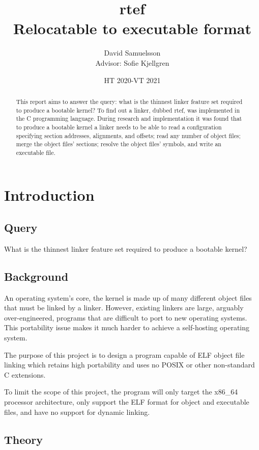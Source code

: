 \documentclass[notitlepage]{report}
\title{%
	rtef \\
	{\large Relocatable to executable format}}
\author{David Samuelsson \\
	{\small Advisor: Sofie Kjellgren}}
\affil{NTI Johanneberg}
\date{HT 2020-VT 2021}
\begin{document}
\maketitle

\begin{abstract}
This report aims to answer the query: what is the thinnest linker feature set required to produce a bootable kernel? To find out a linker, dubbed rtef, was implemented in the C programming language. During research and implementation it was found that to produce a bootable kernel a linker needs to be able to read a configuration specifying section addresses, alignments, and offsets; read any number of object files; merge the object files' sections; resolve the object files' symbols, and write an executable file.
\end{abstract}

\tableofcontents

\section{Introduction}

\subsection{Query}

What is the thinnest linker feature set required to produce a bootable kernel?

\subsection{Background}

An operating system's core, the kernel is made up of many different object files that must be linked by a linker. However, existing linkers are large, arguably over-engineered, programs that are difficult to port to new operating systems. This portability issue makes it much harder to achieve a self-hosting operating system.

The purpose of this project is to design a program capable of ELF object file linking which retains high portability and uses no POSIX or other non-standard C extensions.

To limit the scope of this project, the program will only target the x86\_64 processor architecture, only support the ELF format for object and executable files, and have no support for dynamic linking.

\subsection{Theory}
\end{document}
